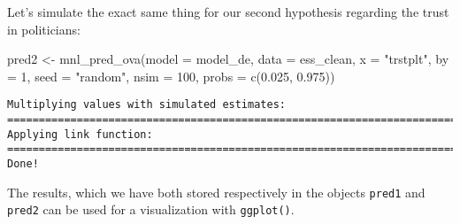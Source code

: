 \documentclass[
  letterpaper,
  DIV=11,
  numbers=noendperiod]{scrreprt}
\newenvironment{Shaded}{\begin{snugshade}}{\end{snugshade}}
\newcommand{\AttributeTok}[1]{\textcolor[rgb]{0.40,0.45,0.13}{#1}}
\newcommand{\DecValTok}[1]{\textcolor[rgb]{0.68,0.00,0.00}{#1}}
\newcommand{\FloatTok}[1]{\textcolor[rgb]{0.68,0.00,0.00}{#1}}
\newcommand{\FunctionTok}[1]{\textcolor[rgb]{0.28,0.35,0.67}{#1}}
\newcommand{\NormalTok}[1]{\textcolor[rgb]{0.00,0.23,0.31}{#1}}
\newcommand{\OtherTok}[1]{\textcolor[rgb]{0.00,0.23,0.31}{#1}}
\newcommand{\StringTok}[1]{\textcolor[rgb]{0.13,0.47,0.30}{#1}}
\begin{document}
Let's simulate the exact same thing for our second hypothesis regarding
the trust in politicians:

\begin{Shaded}
\begin{Highlighting}[]
\NormalTok{pred2 }\OtherTok{\textless{}{-}} \FunctionTok{mnl\_pred\_ova}\NormalTok{(}\AttributeTok{model =}\NormalTok{ model\_de,}
                      \AttributeTok{data =}\NormalTok{ ess\_clean,}
                      \AttributeTok{x =} \StringTok{"trstplt"}\NormalTok{,}
                      \AttributeTok{by =} \DecValTok{1}\NormalTok{,}
                      \AttributeTok{seed =} \StringTok{"random"}\NormalTok{,}
                      \AttributeTok{nsim =} \DecValTok{100}\NormalTok{,}
                      \AttributeTok{probs =} \FunctionTok{c}\NormalTok{(}\FloatTok{0.025}\NormalTok{, }\FloatTok{0.975}\NormalTok{))}
\end{Highlighting}
\end{Shaded}

\begin{verbatim}
Multiplying values with simulated estimates:
================================================================================
Applying link function:
================================================================================
Done!
\end{verbatim}

The results, which we have both stored respectively in the objects
\texttt{pred1} and \texttt{pred2} can be used for a visualization with
\texttt{ggplot()}.
\end{document}
